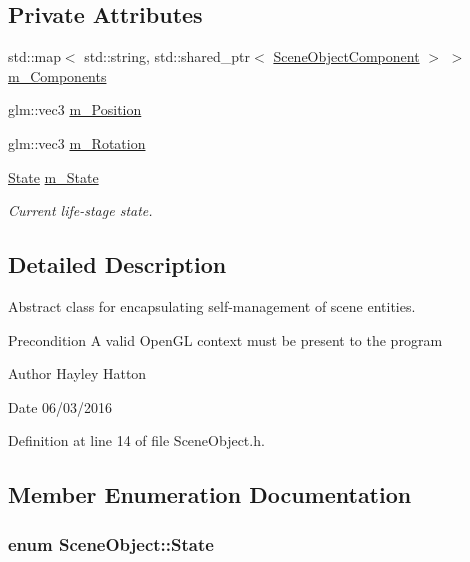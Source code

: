 \subsection*{Private Attributes}
\begin{DoxyCompactItemize}
\item 
std\+::map$<$ std\+::string, std\+::shared\+\_\+ptr$<$ \hyperlink{class_scene_object_component}{Scene\+Object\+Component} $>$ $>$ \hyperlink{class_scene_object_a0e464a9eadb58928b80413b11437fa8b}{m\+\_\+\+Components}
\item 
glm\+::vec3 \hyperlink{class_scene_object_ad657befa8278678b73cafb62dec70b7a}{m\+\_\+\+Position}
\item 
glm\+::vec3 \hyperlink{class_scene_object_a925acd4f041f1f1796652cabf917ca90}{m\+\_\+\+Rotation}
\item 
\hyperlink{class_scene_object_a3e12c3bc61287395d2fb63c370690dc9}{State} \hyperlink{class_scene_object_a3648197f2a904ef0f7cc379ee0858e79}{m\+\_\+\+State}
\begin{DoxyCompactList}\small\item\em Current life-\/stage state. \end{DoxyCompactList}\end{DoxyCompactItemize}


\subsection{Detailed Description}
Abstract class for encapsulating self-\/management of scene entities. 

\begin{DoxyPrecond}{Precondition}
A valid Open\+GL context must be present to the program 
\end{DoxyPrecond}
\begin{DoxyAuthor}{Author}
Hayley Hatton 
\end{DoxyAuthor}
\begin{DoxyDate}{Date}
06/03/2016 
\end{DoxyDate}


Definition at line 14 of file Scene\+Object.\+h.



\subsection{Member Enumeration Documentation}
\subsubsection[{\texorpdfstring{State}{State}}]{\setlength{\rightskip}{0pt plus 5cm}enum {\bf Scene\+Object\+::\+State}\hspace{0.3cm}{\ttfamily [strong]}}\hypertarget{class_scene_object_a3e12c3bc61287395d2fb63c370690dc9}{}\label{class_scene_object_a3e12c3bc61287395d2fb63c370690dc9}


